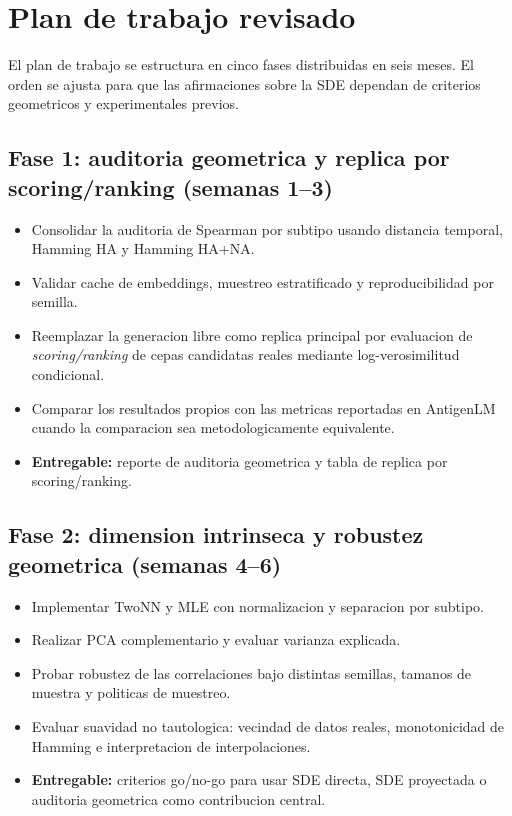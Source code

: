 \documentclass[12pt,letterpaper]{article}
\begin{document}
\section{Plan de trabajo revisado}

El plan de trabajo se estructura en cinco fases distribuidas en seis meses. El orden se ajusta para que las afirmaciones sobre la SDE dependan de criterios geometricos y experimentales previos.

\subsection*{Fase 1: auditoria geometrica y replica por scoring/ranking \texorpdfstring{(semanas 1--3)}{(semanas 1--3)}}

\begin{itemize}[leftmargin=2em]
    \item Consolidar la auditoria de Spearman por subtipo usando distancia temporal, Hamming HA y Hamming HA+NA.
    \item Validar cache de embeddings, muestreo estratificado y reproducibilidad por semilla.
    \item Reemplazar la generacion libre como replica principal por evaluacion de \emph{scoring/ranking} de cepas candidatas reales mediante log-verosimilitud condicional.
    \item Comparar los resultados propios con las metricas reportadas en AntigenLM cuando la comparacion sea metodologicamente equivalente.
    \item \textbf{Entregable:} reporte de auditoria geometrica y tabla de replica por scoring/ranking.
\end{itemize}

\subsection*{Fase 2: dimension intrinseca y robustez geometrica \texorpdfstring{(semanas 4--6)}{(semanas 4--6)}}

\begin{itemize}[leftmargin=2em]
    \item Implementar TwoNN y MLE con normalizacion y separacion por subtipo.
    \item Realizar PCA complementario y evaluar varianza explicada.
    \item Probar robustez de las correlaciones bajo distintas semillas, tamanos de muestra y politicas de muestreo.
    \item Evaluar suavidad no tautologica: vecindad de datos reales, monotonicidad de Hamming e interpretacion de interpolaciones.
    \item \textbf{Entregable:} criterios go/no-go para usar SDE directa, SDE proyectada o auditoria geometrica como contribucion central.
\end{itemize}
\end{document}
